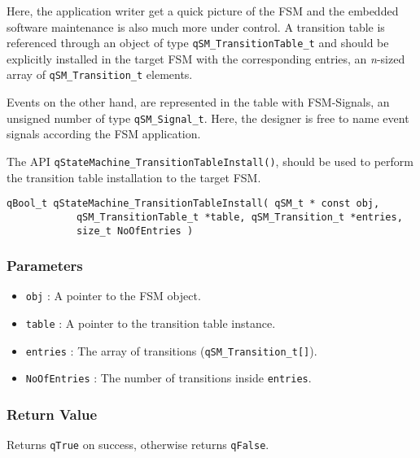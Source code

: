 Here, the application writer get a quick picture of the FSM and the embedded software maintenance is also much more under control. A transition table is referenced through an object of type \lstinline{qSM_TransitionTable_t} and should be explicitly installed in the target FSM with the corresponding entries, an \textit{n}-sized array of \lstinline{qSM_Transition_t} elements. 

Events on the other hand, are represented in the table with FSM-Signals, an unsigned number of type \lstinline{qSM_Signal_t}. Here, the designer is free to name event signals according the FSM application. 

The API \lstinline{qStateMachine_TransitionTableInstall()}, should be used to perform the transition table installation to the target FSM.
\medskip

\begin{lstlisting}[style=CStyle]
qBool_t qStateMachine_TransitionTableInstall( qSM_t * const obj,   
            qSM_TransitionTable_t *table, qSM_Transition_t *entries, 
            size_t NoOfEntries )
\end{lstlisting} 

\subsubsection*{Parameters}
\begin{itemize}
    \item \lstinline{obj} : A pointer to the FSM object. 
    \item \lstinline{table} : A pointer to the transition table instance.
    \item \lstinline{entries} : The array of transitions (\lstinline{qSM_Transition_t[]}). 
    \item \lstinline{NoOfEntries} : The number of transitions inside \lstinline{entries}.
\end{itemize}

\subsubsection*{Return Value}
Returns \lstinline{qTrue} on success, otherwise returns \lstinline{qFalse}.

\hrulefill

